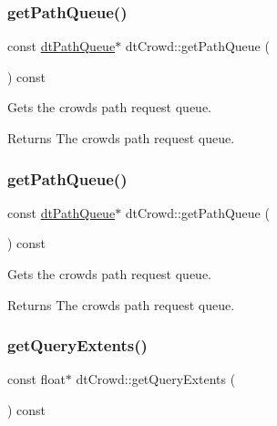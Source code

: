 \subsubsection{\texorpdfstring{get\+Path\+Queue()}{getPathQueue()}\hspace{0.1cm}{\footnotesize\ttfamily [1/2]}}
{\footnotesize\ttfamily const \hyperlink{classdtPathQueue}{dt\+Path\+Queue}$\ast$ dt\+Crowd\+::get\+Path\+Queue (\begin{DoxyParamCaption}{ }\end{DoxyParamCaption}) const\hspace{0.3cm}{\ttfamily [inline]}}

Gets the crowd\textquotesingle{}s path request queue. \begin{DoxyReturn}{Returns}
The crowd\textquotesingle{}s path request queue. 
\end{DoxyReturn}
\mbox{\label{classdtCrowd_a5300bc081c832dde048affb6bd077afb}} 
\subsubsection{\texorpdfstring{get\+Path\+Queue()}{getPathQueue()}\hspace{0.1cm}{\footnotesize\ttfamily [2/2]}}
{\footnotesize\ttfamily const \hyperlink{classdtPathQueue}{dt\+Path\+Queue}$\ast$ dt\+Crowd\+::get\+Path\+Queue (\begin{DoxyParamCaption}{ }\end{DoxyParamCaption}) const\hspace{0.3cm}{\ttfamily [inline]}}

Gets the crowd\textquotesingle{}s path request queue. \begin{DoxyReturn}{Returns}
The crowd\textquotesingle{}s path request queue. 
\end{DoxyReturn}
\mbox{\label{classdtCrowd_a6a37c9f57844d91e46fd4c8ef9de17b0}} 
\subsubsection{\texorpdfstring{get\+Query\+Extents()}{getQueryExtents()}\hspace{0.1cm}{\footnotesize\ttfamily [1/2]}}
{\footnotesize\ttfamily const float$\ast$ dt\+Crowd\+::get\+Query\+Extents (\begin{DoxyParamCaption}{ }\end{DoxyParamCaption}) const\hspace{0.3cm}{\ttfamily [inline]}}

